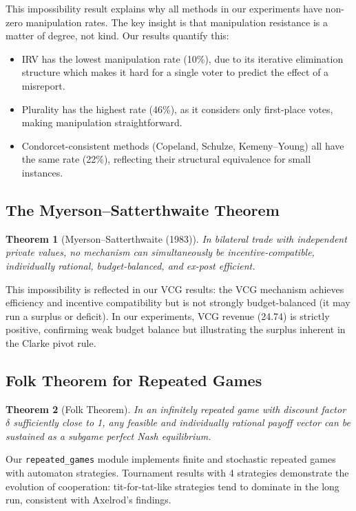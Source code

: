 \documentclass[10pt]{article}
\newtheorem{theorem}{Theorem}
\begin{document}
This impossibility result explains why all methods in our experiments have non-zero manipulation rates. The key insight is that manipulation resistance is a matter of degree, not kind. Our results quantify this:
\begin{itemize}[leftmargin=*,itemsep=1pt]
  \item IRV has the lowest manipulation rate (10\%), due to its iterative elimination structure which makes it hard for a single voter to predict the effect of a misreport.
  \item Plurality has the highest rate (46\%), as it considers only first-place votes, making manipulation straightforward.
  \item Condorcet-consistent methods (Copeland, Schulze, Kemeny--Young) all have the same rate (22\%), reflecting their structural equivalence for small instances.
\end{itemize}

\subsection{The Myerson--Satterthwaite Theorem}

\begin{theorem}[Myerson--Satterthwaite (1983)]
In bilateral trade with independent private values, no mechanism can simultaneously be incentive-compatible, individually rational, budget-balanced, and ex-post efficient.
\end{theorem}

This impossibility is reflected in our VCG results: the VCG mechanism achieves efficiency and incentive compatibility but is not strongly budget-balanced (it may run a surplus or deficit). In our experiments, VCG revenue (24.74) is strictly positive, confirming weak budget balance but illustrating the surplus inherent in the Clarke pivot rule.

\subsection{Folk Theorem for Repeated Games}

\begin{theorem}[Folk Theorem]
In an infinitely repeated game with discount factor $\delta$ sufficiently close to 1, any feasible and individually rational payoff vector can be sustained as a subgame perfect Nash equilibrium.
\end{theorem}

Our \texttt{repeated\_games} module implements finite and stochastic repeated games with automaton strategies. Tournament results with 4 strategies demonstrate the evolution of cooperation: tit-for-tat-like strategies tend to dominate in the long run, consistent with Axelrod's findings.
\end{document}
